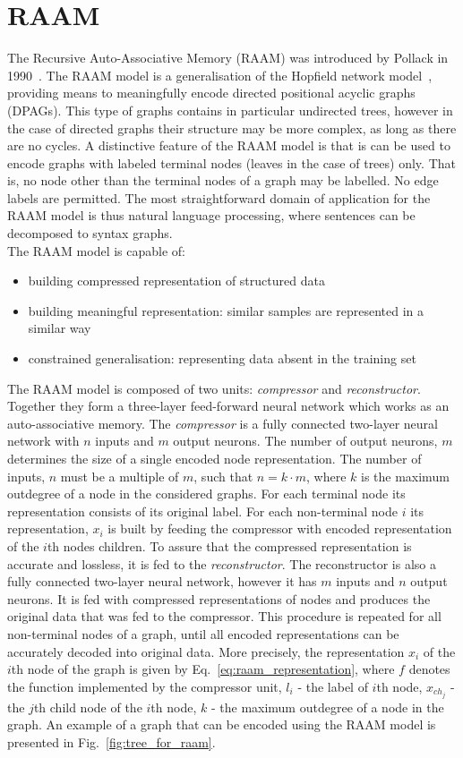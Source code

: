 \section{RAAM}
The Recursive Auto-Associative Memory (RAAM) was introduced by Pollack in 1990~\cite{pollack1990recursive}. The RAAM model is a generalisation of the Hopfield network model~\cite{goulon2005hopfield}, providing means to meaningfully encode directed positional acyclic graphs (DPAGs). This type of graphs contains in particular undirected trees, however in the case of directed graphs their structure may be more complex, as long as there are no cycles. A distinctive feature of the RAAM model is that is can be used to encode graphs with labeled terminal nodes (leaves in the case of trees) only. That is, no node other than the terminal nodes of a graph may be labelled. No edge labels are permitted. The most straightforward domain of application for the RAAM model is thus natural language processing, where sentences can be decomposed to syntax graphs.\\
\noindent The RAAM model is capable of:
\begin{itemize}
	\item building compressed representation of structured data
	\item building meaningful representation: similar samples are represented in a similar way
	\item constrained generalisation: representing data absent in the training set
\end{itemize}
The RAAM model is composed of two units: \emph{compressor} and \emph{reconstructor}. Together they form a three-layer feed-forward neural network which works as an auto-associative memory. The \emph{compressor} is a fully connected two-layer neural network with $n$ inputs and $m$ output neurons. The number of output neurons, $m$ determines the size of a single encoded node representation. The number of inputs, $n$ must be a multiple of $m$, such that $n = k \cdot m$, where $k$ is the maximum outdegree of a node in the considered graphs. For each terminal node its representation consists of its original label. For each non-terminal node $i$ its representation, $x_i$ is built by feeding the compressor with encoded representation of the $i$th nodes children. To assure that the compressed representation is accurate and lossless, it is fed to the \emph{reconstructor}. The reconstructor is also a fully connected two-layer neural network, however it has $m$ inputs and $n$ output neurons. It is fed with compressed representations of nodes and produces the original data that was fed to the compressor. This procedure is repeated for all non-terminal nodes of a graph, until all encoded representations can be accurately decoded into original data. More precisely, the representation $x_i$ of the $i$th node of the graph is given by Eq.~\ref{eq:raam_representation}, where $f$ denotes the function implemented by the compressor unit, $l_i$ - the label of $i$th node, $x_{ch_j}$ - the $j$th child node of the $i$th node, $k$ - the maximum outdegree of a node in the graph. An example of a graph that can be encoded using the RAAM model is presented in Fig.~\ref{fig:tree_for_raam}.

